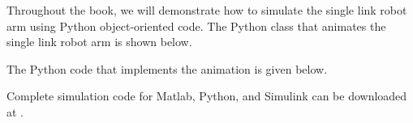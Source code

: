 Throughout the book, we will demonstrate how to simulate the single link robot arm using Python object-oriented code.  The Python class that animates the single link robot arm is shown below.


The Python code that implements the animation is given below.


Complete simulation code for Matlab, Python, and Simulink can be downloaded at .





